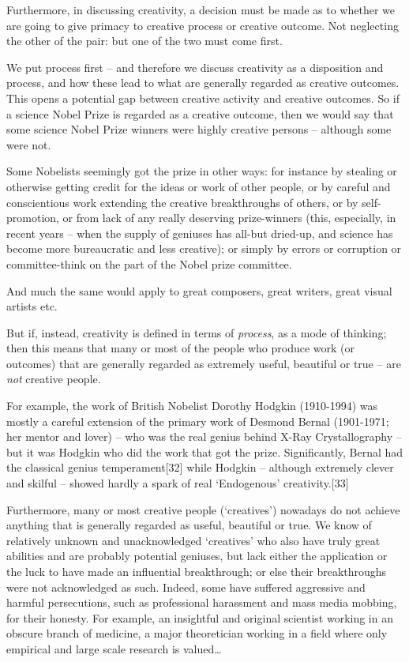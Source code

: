 \documentclass[
]{book}
\begin{document}
Furthermore, in discussing creativity, a decision must be made as to whether we are going to give primacy to creative process or creative outcome. Not neglecting the other of the pair: but one of the two must come first.

We put process first -- and therefore we discuss creativity as a disposition and process, and how these lead to what are generally regarded as creative outcomes. This opens a potential gap between creative activity and creative outcomes. So if a science Nobel Prize is regarded as a creative outcome, then we would say that some science Nobel Prize winners were highly creative persons -- although some were not.

Some Nobelists seemingly got the prize in other ways: for instance by stealing or otherwise getting credit for the ideas or work of other people, or by careful and conscientious work extending the creative breakthroughs of others, or by self-promotion, or from lack of any really deserving prize-winners (this, especially, in recent years -- when the supply of geniuses has all-but dried-up, and science has become more bureaucratic and less creative); or simply by errors or corruption or committee-think on the part of the Nobel prize committee.

And much the same would apply to great composers, great writers, great visual artists etc.

But if, instead, creativity is defined in terms of \emph{process}, as a mode of thinking; then this means that many or most of the people who produce work (or outcomes) that are generally regarded as extremely useful, beautiful or true -- are \emph{not} creative people.

For example, the work of British Nobelist Dorothy Hodgkin (1910-1994) was mostly a careful extension of the primary work of Desmond Bernal (1901-1971; her mentor and lover) -- who was the real genius behind X-Ray Crystallography -- but it was Hodgkin who did the work that got the prize. Significantly, Bernal had the classical genius temperament{[}32{]} while Hodgkin -- although extremely clever and skilful -- showed hardly a spark of real `Endogenous' creativity.{[}33{]}

Furthermore, many or most creative people (`creatives') nowadays do not achieve anything that is generally regarded as useful, beautiful or true. We know of relatively unknown and unacknowledged `creatives' who also have truly great abilities and are probably potential geniuses, but lack either the application or the luck to have made an influential breakthrough; or else their breakthroughs were not acknowledged as such. Indeed, some have suffered aggressive and harmful persecutions, such as professional harassment and mass media mobbing, for their honesty. For example, an insightful and original scientist working in an obscure branch of medicine, a major theoretician working in a field where only empirical and large scale research is valued\ldots{}
\end{document}
